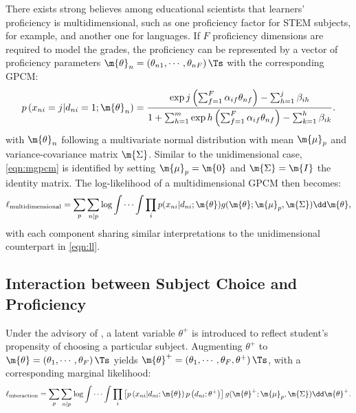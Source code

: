 There exists strong believes among educational scientists that learners' proficiency is multidimensional, such as one proficiency factor for STEM subjects, for example, and another one for languages. If $F$ proficiency dimensions are required to model the grades, the proficiency can be represented by a vector of proficiency parameters $\m{\theta}_n=\left(\theta_{n1}, \cdots, \theta_{nF}\right)\Ts$ with the corresponding GPCM:
\begin{equation}\label{eqn:mgpcm}
    p \left( x_{ni} = j | d_{ni} = 1; \m{\theta}_n \right) =
    \frac{ \exp{ j \left( \sum_{f=1}^F \alpha_{if} \theta_{nf} \right) - \sum_{h=1}^j \beta_{ih} } }{ 1 + \sum_{h=1}^m \exp{ h \left( \sum_{f=1}^F \alpha_{if} \theta_{nf} \right) - \sum_{k=1}^h \beta_{ik} } }.
\end{equation}
with $\m{\theta}_n$ following a multivariate normal distribution with mean $\m{\mu}_p$ and variance-covariance matrix $\m{\Sigma}$. Similar to the unidimensional case, \cref{eqn:mgpcm} is identified by setting $\m{\mu}_p=\m{0}$ and $\m{\Sigma} = \m{I}$ the identity matrix. The log-likelihood of a multidimensional GPCM then becomes:
\begin{equation}\label{eqn:mll}
    \ell_\text{multidimensional} = \sum_{p} \sum_{n | p} \log \int \cdots \int \prod_i p( x_{ni} | d_{ni}; \m{\theta} ) g( \m{\theta}; \m{\mu}_p, \m{\Sigma} ) \dd \m{\theta},
\end{equation}
with each component sharing similar interpretations to the unidimensional counterpart in \cref{eqn:ll}.

\subsection{Interaction between Subject Choice and Proficiency}

Under the advisory of \textcite{korobko:2008}, a latent variable $\theta^+$ is introduced to reflect student's propensity of choosing a particular subject. Augmenting $\theta^+$ to $\m{\theta}=\left(\theta_1, \cdots, \theta_F\right)\Ts$ yields $\m{\theta}^+=\left(\theta_1, \cdots, \theta_F, \theta^+\right)\Ts$, with a corresponding marginal likelihood:
\begin{equation}\label{eqn:lli}
    \ell_\text{interaction} = \sum_p \sum_{ n | p} \log \int \cdots \int \prod_i \left[ p \left( x_{ni} | d_{ni}; \m{\theta} \right) p \left( d_{ni}; \theta^+ \right) \right] g(\m{\theta}^+; \m{\mu}_p, \m{\Sigma}) \dd \m{\theta}^+ .
\end{equation}

